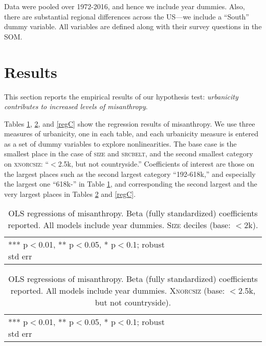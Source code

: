 \documentclass[11pt, letterpaper]{article}
\begin{document}
\begin{spacing}{1.4}
Data were pooled over 1972-2016, and hence we include year dummies. Also, there
are substantial regional differences across the US---we include a ``South'' dummy variable. All variables are defined along with their survey questions in the SOM.

\section*{Results}

This section reports the empirical results of our hypothesis test:
 \textit{urbanicity contributes to increased levels of misanthropy}.

Tables \ref{regA}, \ref{regB}, and \ref{regC} show the regression results of misanthropy. We use three measures of
urbanicity, one in each table,  and each urbanicity measure is entered as a set of dummy variables to
explore nonlinearities. The base case is the smallest place in the case of
\textsc{size} and \textsc{srcbelt}, and the second smallest category on \textsc{xnorcsiz}:
 ``$<$2.5k, but not countryside.'' Coefficients of interest are those on the
 largest  places such as the second largest category ``192-618k,'' and especially the largest one ``618k-'' in Table
\ref{regA}, and corresponding the second largest and the very largest places in Tables
\ref{regB} and \ref{regC}.

\begin{table}[h!]\centering
\caption{OLS regressions  of misanthropy. Beta (fully standardized) coefficients
  reported. All models include year dummies. \textsc{Size} deciles (base: $<$2k).} \label{regA}
\begin{scriptsize} \begin{tabular}{p{1.8in}p{.45in}p{.45in}p{.45in}p{.45in}p{.45in}p{.45in}p{.45in}p{.45in}p{.45in}p{.45 in}}\hline

\hline  *** p$<$0.01, ** p$<$0.05, * p$<$0.1; robust std err
\end{tabular}\end{scriptsize}\end{table}

\begin{table}[h!]\centering
\caption{OLS regressions  of misanthropy. Beta (fully standardized) coefficients
  reported. All models include year dummies.  \textsc{Xnorcsiz} (base: $<$2.5k, but not countryside).} \label{regB}
\begin{scriptsize} \begin{tabular}{p{1.8in}p{.45in}p{.45in}p{.45in}p{.45in}p{.45in}p{.45in}p{.45in}p{.45in}p{.45in}p{.45 in}}\hline

\hline  *** p$<$0.01, ** p$<$0.05, * p$<$0.1; robust std err
\end{tabular}\end{scriptsize}\end{table}


\end{spacing}
\end{document}

